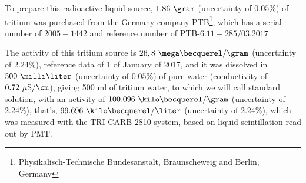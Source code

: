 To prepare this radioactive liquid source, $1.86~\gram$ (uncertainty of $0.05\%$) of tritium was purchased from the Germany company PTB\footnote{Physikalisch-Technische Bundesanstalt, Braunscheweig and Berlin, Germany}, which has a serial number of $2005-1442$ and reference number of PTB-$6.11-285/03.2017$ \cite{TritiumSourceTechnicalFile}


The activity of this tritium source is $26,8~\mega\becquerel/\gram$ (uncertainty of $2.24\%$), reference data of 1 of January of 2017, and it was dissolved in $500~\milli\liter$ (uncertainty of $0.05\%$) of pure water (conductivity of $0.72~\mu\text{S}/\cm$), giving 500 ml of tritium water, to which we will call standard solution, with an activity of $100.096~\kilo\becquerel/\gram$ (uncertainty of $2.24\%$), that's, $99.696~\kilo\becquerel/\liter$ (uncertainty of $2.24\%$), which was measured with the TRI-CARB 2810 system, based on liquid scintillation read out by PMT.